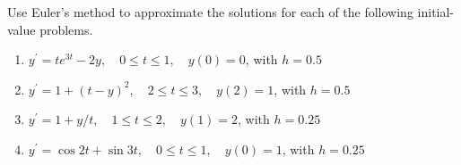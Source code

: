 \begin{myexercise}%
Use Euler's method to approximate the solutions for each of the following initial-value problems.
\begin{enumerate}[label=(\alph*)]
\item $y^{\prime}=t e^{3 t}-2 y, \quad 0 \leq t \leq 1, \quad y(0)=0$, with $h=0.5$
\item $y^{\prime}=1+(t-y)^{2}, \quad 2 \leq t \leq 3, \quad y(2)=1$, with $h=0.5$
\item $y^{\prime}=1+y / t, \quad 1 \leq t \leq 2, \quad y(1)=2$, with $h=0.25$
\item $y^{\prime}=\cos 2 t+\sin 3 t, \quad 0 \leq t \leq 1, \quad y(0)=1$, with $h=0.25$
\end{enumerate}


\end{myexercise}
